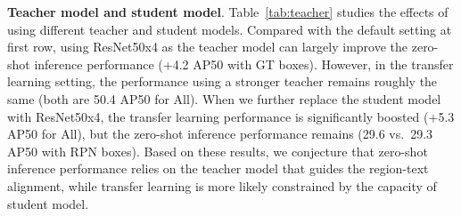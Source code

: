\smallskip
\noindent \textbf{Teacher model and student model}. Table~\ref{tab:teacher} studies the effects of using different teacher and student models. Compared with the default setting at first row, using ResNet50x4 as the teacher model can largely improve the zero-shot inference performance (+4.2 AP50 with GT boxes). However, in the transfer learning setting, the performance using a stronger teacher remains roughly the same (both are 50.4 AP50 for All). When we further replace the student model with ResNet50x4, the transfer learning performance is significantly boosted (+5.3 AP50 for All), but the zero-shot inference performance remains (29.6 vs.\ 29.3 AP50 with RPN boxes). Based on these results, we conjecture that zero-shot inference performance relies on the teacher model that guides the region-text alignment, while transfer learning is more likely constrained by the capacity of student model. 



